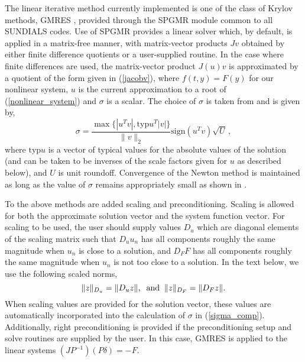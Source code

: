 The linear iterative method currently implemented is one of the class of 
Krylov methods, GMRES \cite{BrHi:89,SaSc:86}, 
provided through the SPGMR module common to all SUNDIALS codes. 
Use of SPGMR provides a linear solver which, by default, is applied in a 
matrix-free manner, with matrix-vector products $Jv$ obtained by either 
finite difference quotients or a user-supplied routine.
In the case where finite differences are used, 
the matrix-vector product $J(u)v$ is approximated by a quotient of the form
given in (\ref{jacobv}),
where $f(t, y) = F(y)$ for our nonlinear system, 
$u$ is the current approximation to a root of (\ref{nonlinear_system}) 
and $\sigma$ is a scalar.  The choice of $\sigma$ is taken from 
\cite{BrSa:90} and is given by,
\begin{equation}\label{sigma_comp}
  \sigma = \frac{\max \{|u^T v|, \mbox{typ}u^T |v|\}}{\|v\|_2} 
  \mbox{sign}(u^T v) \sqrt{U} \, ,
\end{equation}
where $\mbox{typ}u$ is a vector of typical values for the absolute
values of the solution (and can be taken to be inverses of the scale
factors given for $u$ as described below), and $U$ is unit roundoff.
Convergence of the Newton method is maintained as long as the value of
$\sigma$ remains appropriately small as shown in \cite{Bro:87}.

To the above methods are added scaling and preconditioning. Scaling is allowed
for both the approximate solution vector and the system function vector.
For scaling to be used, the user should supply values $D_u$ which
are diagonal elements of the scaling matrix such that $D_u u_n$ has all
components roughly the same magnitude when $u_n$ is close to a solution,
and $D_F F$ has all components roughly the same magnitude when $u_n$ is not
too close to a solution.
In the text below, we use the following scaled norms,
\begin{equation}
\|z\|_{D_u} = \|D_u z\|, \;\; {\rm and} \;\; \|z\|_{D_F} = \|D_F z\|.
\end{equation}
When scaling values are provided for the solution vector, these values are 
automatically incorporated into the calculation of $\sigma$ in
(\ref{sigma_comp}).
Additionally, right preconditioning is provided if the preconditioning 
setup and solve routines are supplied by the user.  In this case,
GMRES is applied to the linear systems $(JP^{-1})(P\delta) = -F$.


